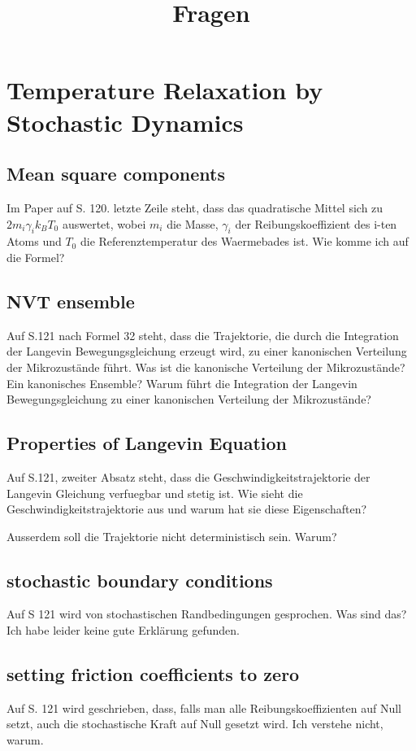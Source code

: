 \documentclass[]{article}
\title{Fragen}
\begin{document}
\maketitle

\section{Temperature Relaxation by Stochastic Dynamics}

\subsection{Mean square components}
Im Paper auf S. 120. letzte Zeile steht, dass das quadratische Mittel sich zu $2 m_i \gamma_i k_B T_0$ auswertet, wobei $m_i$ die Masse, $\gamma_i$ der Reibungskoeffizient des i-ten Atoms und $T_0$ die Referenztemperatur des Waermebades ist. Wie komme ich auf die Formel?   

\subsection{NVT ensemble}
Auf S.121 nach Formel 32 steht, dass die Trajektorie, die durch die Integration der Langevin Bewegungsgleichung erzeugt wird, zu einer kanonischen Verteilung der Mikrozustände führt. Was ist die kanonische Verteilung der Mikrozustände? Ein kanonisches Ensemble? Warum führt die Integration der Langevin Bewegungsgleichung zu einer kanonischen Verteilung der Mikrozustände?

\subsection{Properties of Langevin Equation}
Auf S.121, zweiter Absatz steht, dass die Geschwindigkeitstrajektorie der Langevin Gleichung verfuegbar und stetig ist. Wie sieht die Geschwindigkeitstrajektorie aus und warum hat sie diese Eigenschaften?

Ausserdem soll die Trajektorie nicht deterministisch sein. Warum?  

\subsection{stochastic boundary conditions}
Auf S 121 wird von stochastischen Randbedingungen gesprochen. Was sind das? Ich habe leider keine gute Erklärung gefunden.

\subsection{setting friction coefficients to zero}
Auf S. 121 wird geschrieben, dass, falls man alle Reibungskoeffizienten auf Null setzt, auch die stochastische Kraft auf Null gesetzt wird. Ich verstehe nicht, warum. 
\end{document}
